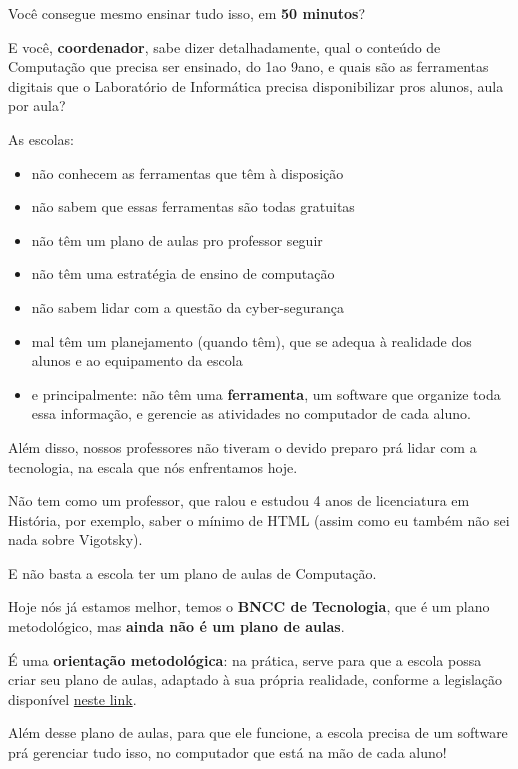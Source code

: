\begin{multicols}{2}
Você consegue mesmo ensinar tudo isso, em \textbf{50 minutos}?

E você, \textbf{coordenador}, sabe dizer detalhadamente, qual o conteúdo de Computação que precisa ser ensinado, do 1\textordmasculine\space ao 9\textordmasculine\space ano, e quais são as ferramentas digitais que o Laboratório de Informática precisa disponibilizar pros alunos, aula por aula?

As escolas:

\begin{itemize}
	\item não conhecem as ferramentas que têm à disposição
	\item não sabem que essas ferramentas são todas gratuitas
	\item não têm um plano de aulas pro professor seguir
	\item não têm uma estratégia de ensino de computação
	\item não sabem lidar com a questão da cyber-segurança
	\item mal têm um planejamento (quando têm), que se adequa à realidade dos alunos e ao equipamento da escola
 \item e principalmente: não têm uma \textbf{ferramenta}, um software que organize toda essa informação, e gerencie as atividades no computador de cada aluno.
\end{itemize}

Além disso, nossos professores não tiveram o devido preparo prá lidar com a tecnologia, na escala que nós enfrentamos hoje.

Não tem como um professor, que ralou e estudou 4 anos de licenciatura em História, por exemplo, saber o mínimo de HTML (assim como eu também não sei nada sobre Vigotsky).

E não basta a escola ter um plano de aulas de Computação.

Hoje nós já estamos melhor, temos o \textbf{BNCC de Tecnologia}, que é um plano metodológico, mas \textbf{ainda não é um plano de aulas}.

É uma \textbf{orientação metodológica}: na prática, serve para que a escola possa criar seu plano de aulas, adaptado à sua própria realidade, conforme a legislação disponível \href{http://portal.mec.gov.br/index.php?option=com_docman&view=download&alias=241671-rceb001-22&category_slug=outubro-2022-pdf&Itemid=30192}{neste link}.

Além desse plano de aulas, para que ele funcione, a escola precisa de um software prá gerenciar tudo isso, no computador que está na mão de cada aluno!


\end{multicols}
